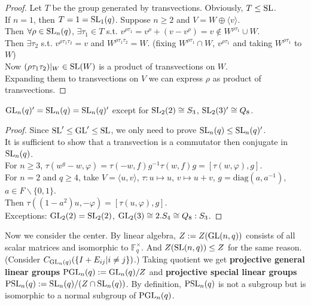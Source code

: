 \documentclass[a4paper,11pt]{article}
\begin{document}
\begin{proof}
    Let $T$ be the group generated by transvections. Obviously, $T\leq \mathrm{SL}$. \\If $n=1$, then $T=1=\mathrm{SL}_1(q)$. Suppose $n\geq 2$ and $V=W\oplus\langle v\rangle$. \\
    Then $\forall \rho\in\mathrm{SL}_n(q)$, $\exists \tau_1\in T$ s.t. $v^{\rho \tau_1}=v^{\rho}+(v-v^{\rho})=v\not\in  W^{\rho\tau_1}\cup W$. \\
    Then $\exists \tau_2$ s.t. $v^{\rho \tau_1\tau_2}=v$ and $W^{\rho \tau_1\tau_2}=W$. (fixing $W^{\rho\tau_1}\cap W$, $v^{\rho \tau_1}$ and taking $W^{\rho \tau_1}$ to $W$)\\
    Now $(\rho\tau_1\tau_2)|_W\in\mathrm{SL}(W)$ is a product of transvections on $W$.\\
    Expanding them to transvections on $V$ we can express $\rho$ as product of transvections.
\end{proof}

\begin{lemma}\label{perfectness}
    $\mathrm{GL}_n(q)'=\mathrm{SL}_n(q)=\mathrm{SL}_n(q)'$ except for $\mathrm{SL}_2(2)\cong S_3$, $\mathrm{SL}_2(3)'\cong Q_8$.
\end{lemma}
\begin{proof}
    Since $\mathrm{SL}'\leq \mathrm{GL}'\leq \mathrm{SL}$, we only need to prove $\mathrm{SL}_n(q)\leq \mathrm{SL}_n(q)'$. \\
    It is sufficient to show that a transvection is a commutator then conjugate in $\mathrm{SL}_n(q)$. \\
    For $n\geq 3$, $\tau(w^g-w,\varphi)=\tau(-w,f)g^{-1}\tau(w,f)g=[\tau(w,\varphi),g]$.\\
    For $n=2$ and $q\geq 4$, take $V=\langle u,v\rangle$, $\tau:u\mapsto u$, $v\mapsto u+v$, $g=\mathrm{diag}(a,a^{-1})$, $a\in F\backslash\{0,1\}$. \\
    Then $\tau((1-a^2)u,-\varphi)=[\tau(u,\varphi),g]$.\\
    Exceptions: $\mathrm{GL}_2(2)=\mathrm{SL}_2(2)$, $\mathrm{GL}_2(3)\cong 2.S_4\cong Q_8:S_3$.
\end{proof}

Now we consider the center. By linear algebra, $Z:=Z(\mathrm{GL}(n,q))$ consists of all scalar matrices and isomorphic to $\mathbb{F}_q^\times$. And $Z(\mathrm{SL}(n,q))\leq Z$ for the same reason.(Consider $C_{\mathrm{GL}_n(q)}(\{ I+E_{ij}|i\neq j\})$.) Taking quotient we get \textbf{projective general linear groups} $\mathrm{PGL}_n(q):=\mathrm{GL}_n(q)/Z$ and \textbf{projective special linear groups} $\mathrm{PSL}_n(q):=\mathrm{SL}_n(q)/(Z\cap\mathrm{SL}_n(q))$. By definition, $\mathrm{PSL}_n(q)$ is not a subgroup but is isomorphic to a normal subgroup of $\mathrm{PGL}_n(q)$.
\end{document}
